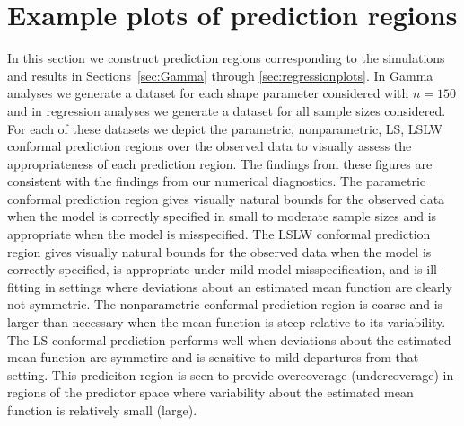 \documentclass[11pt]{article}\usepackage[]{graphicx}\usepackage[]{color}
\begin{document}
\newpage
\section{Example plots of prediction regions}
\label{sec:plotsofregions}

In this section we construct prediction regions corresponding to the 
simulations and results in Sections~\ref{sec:Gamma} through 
\ref{sec:regressionplots}.  In Gamma analyses we generate a dataset for each 
shape parameter considered with $n = 150$ and in regression analyses we 
generate a dataset for all sample sizes considered.  For each of these datasets 
we depict the parametric, nonparametric, LS, LSLW conformal prediction regions 
over the observed data to visually assess the appropriateness of each 
prediction region.  The findings from these figures are consistent with the 
findings from our numerical diagnostics.  
The parametric conformal prediction region gives visually natural bounds for 
the observed data when the model is correctly specified in small to moderate 
sample sizes and is appropriate when the model is misspecified. 
The LSLW conformal prediction region gives visually natural bounds for the 
observed data when the model is correctly specified, is appropriate under mild 
model misspecification, and is ill-fitting in settings where deviations about 
an estimated mean function are clearly not symmetric.
The nonparametric conformal prediction region is coarse and is larger than 
necessary when the mean function is steep relative to its variability.  
The LS conformal prediction performs well when deviations about the estimated 
mean function are symmetirc and is sensitive to mild departures from that 
setting.  This prediciton region is seen to provide overcoverage 
(undercoverage) in regions of the predictor space where variability about the 
estimated mean function is relatively small (large).
\end{document}
